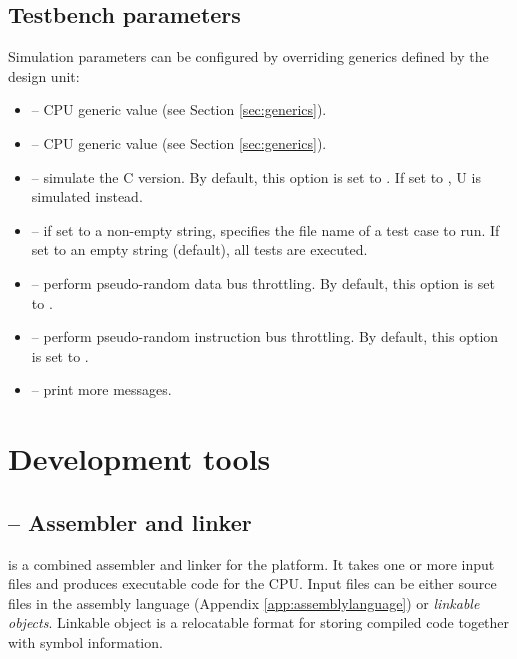 \documentclass[a4paper,12pt,twoside,extrafontsizes]{memoir}
\begin{document}
\section{Testbench parameters}

Simulation parameters can be configured by overriding generics defined by the  design unit:

\begin{itemize}
	\item {} --  CPU generic value (see Section \ref{sec:generics}).
	\item {} --  CPU generic value (see Section \ref{sec:generics}).
	\item {} -- simulate the \lxp{}C version. By default, this option is set to . If set to , \lxp{}U is simulated instead.
	\item {} -- if set to a non-empty string, specifies the file name of a test case to run. If set to an empty string (default), all tests are executed.
	\item {} -- perform pseudo-random data bus throttling. By default, this option is set to .
	\item {} -- perform pseudo-random instruction bus throttling. By default, this option is set to .
	\item {} -- print more messages.
\end{itemize}

\chapter{Development tools}
\label{ch:developmenttools}

\section{ -- Assembler and linker}
\label{sec:lxp32asm}

 is a combined assembler and linker for the \lxp{} platform. It takes one or more input files and produces executable code for the CPU. Input files can be either source files in the \lxp{} assembly language (Appendix \ref{app:assemblylanguage}) or \emph{linkable objects}. Linkable object is a relocatable format for storing compiled \lxp{} code together with symbol information.
\end{document}
